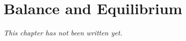 \chapter{Balance and Equilibrium}\label{ch:g2:balance-equilibrium}


\emph{This chapter has not been written yet.}
